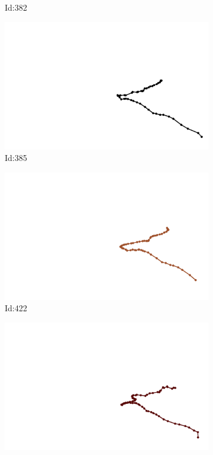 \documentclass[12pt,twoside]{report}
\begin{document}
\begin{figure}
\begin{subfigure}[b]{0.20\textwidth}
\caption{Id:382}
\end{subfigure}
\begin{subfigure}[b]{0.20\textwidth}
\centering
\includegraphics[width=\textwidth]{../trajectories/385.png}
\caption{Id:385}
\end{subfigure}
\begin{subfigure}[b]{0.20\textwidth}
\centering
\includegraphics[width=\textwidth]{../trajectories/422.png}
\caption{Id:422}
\end{subfigure}
\begin{subfigure}[b]{0.20\textwidth}
\centering
\includegraphics[width=\textwidth]{../trajectories/453.png}

\end{subfigure}
\end{figure}
\end{document}
